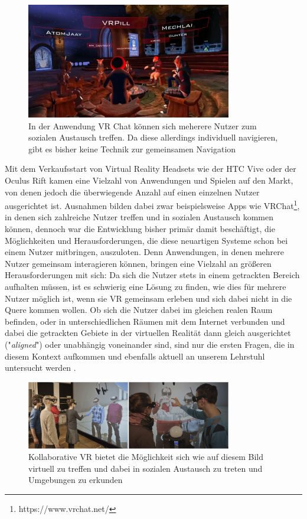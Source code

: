 \begin{figure}[h]
  \centering
  \includegraphics[width=0.8\textwidth]{images/vr_chat.png}
  \caption{In der Anwendung VR Chat können sich meherere Nutzer zum sozialen Austausch treffen. Da diese allerdings individuell navigieren, gibt es bisher keine Technik zur gemeinsamen Navigation}
  \label{fig:todo}
\end{figure}


Mit dem Verkaufsstart von Virtual Reality Headsets wie der HTC Vive oder der Oculus Rift kamen eine Vielzahl von Anwendungen und Spielen auf den Markt, von denen jedoch die überwiegende Anzahl auf einen einzelnen Nutzer ausgerichtet ist. Ausnahmen bilden dabei zwar beispielsweise Apps wie VRChat\footnote{https://www.vrchat.net/}, in denen sich zahlreiche Nutzer treffen und in sozialen Austausch kommen können, dennoch war die Entwicklung bisher primär damit beschäftigt, die Möglichkeiten und Herausforderungen, die diese neuartigen Systeme schon bei einem Nutzer mitbringen, auszuloten. 
Denn Anwendungen, in denen mehrere Nutzer gemeinsam interagieren können, bringen eine Vielzahl an größeren Herausforderungen mit sich: Da sich die Nutzer stets in einem getrackten Bereich aufhalten müssen, ist es schwierig eine Lösung zu finden, wie dies für mehrere Nutzer möglich ist, wenn sie VR gemeinsam erleben und sich dabei nicht in die Quere kommen wollen. Ob sich die Nutzer dabei im gleichen realen Raum befinden, oder in unterschiedlichen Räumen mit dem Internet verbunden und dabei die getrackten Gebiete in der virtuellen Realität dann gleich ausgerichtet ("\textit{aligned}") oder unabhängig voneinander sind, sind nur die ersten Fragen, die in diesem Kontext aufkommen und ebenfalls aktuell an unserem Lehrstuhl untersucht werden \cite{WeisskerMulti-RayReality}.

\begin{figure}[H]
	\centering
		\includegraphics[width=0.8\textwidth]{images/collaborative.jpg}
	\caption{Kollaborative VR bietet die Möglichkeit sich wie auf diesem Bild virtuell zu treffen und dabei in sozialen Austausch zu treten und Umgebungen zu erkunden \cite{BeckImmersiveTelepresence}}
\end{figure}


